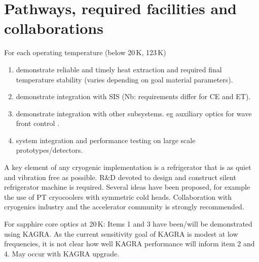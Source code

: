 %


\section{Pathways, required facilities and collaborations}
%
For each operating temperature (below 20\,K, 123\,K)


\begin{enumerate}
\item demonstrate reliable and timely  heat extraction and required final temperature stability (varies depending on goal material parameters).
\item demonstrate integration with SIS   (Nb: requirements differ for CE and ET).
\item demonstrate integration with other subsystems.  eg auxiliary optics  for  wave front control .
\item system integration and performance  testing on large scale prototypes/detectors.
\end{enumerate}

A key element of any cryogenic implementation is a refrigerator that is as quiet and vibration free as possible. R\&D devoted to design and construct silent refrigerator machine is required.  Several ideas have been proposed, for example the use of PT cryocoolers with symmetric cold heads.  Collaboration with cryogenics industry and the accelerator community is strongly recommended. 

For sapphire core optics at 20\,K:   Items 1 and 3 have been/will be demonstrated using KAGRA.  As the current sensitivity goal of KAGRA is modest at low frequencies, it is not clear how well KAGRA performance will inform item 2 and 4.  May occur with KAGRA upgrade.

